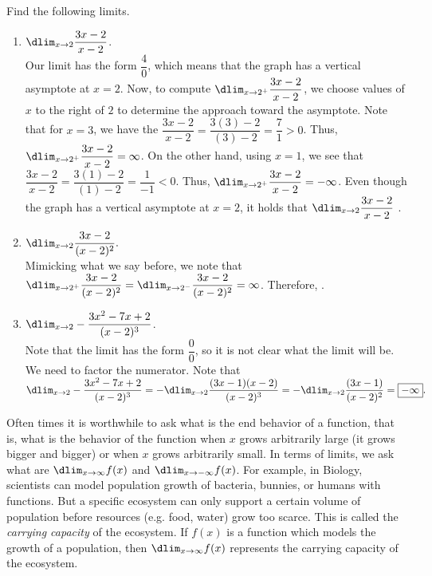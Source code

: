 \documentclass{book}
\begin{document}
\begin{Exam} Find the following limits.
\begin{enumerate}
\item $\dlim_{x\to 2} \dfrac{3x-2}{x-2}$.\\

Our limit has the form $\dfrac{4}{0}$, which means that the graph has a vertical asymptote at $x=2$. Now, to compute $\dlim_{x\to 2^+} \dfrac{3x-2}{x-2}$, we choose values of $x$ to the right of $2$ to determine the approach toward the asymptote. Note that for $x=3$, we have the $\dfrac{3x-2}{x-2}= \dfrac{3(3)-2}{(3)-2} = \dfrac{7}{1}>0$. Thus, $\dlim_{x\to 2^+} \dfrac{3x-2}{x-2} = \infty$. On the other hand, using $x=1$, we see that $\dfrac{3x-2}{x-2}= \dfrac{3(1)-2}{(1)-2} = \dfrac{1}{-1}<0$. Thus, $\dlim_{x\to 2^+} \dfrac{3x-2}{x-2} = -\infty$. Even though the graph has a vertical asymptote at $x=2$, it holds that $\dlim_{x\to 2} \dfrac{3x-2}{x-2}$ . \\

\item $\dlim_{x\to 2} \dfrac{3x-2}{(x-2)^2}.$\\

Mimicking what we say before, we note that $\dlim_{x\to 2^+} \dfrac{3x-2}{(x-2)^2} = \dlim_{x\to 2^-} \dfrac{3x-2}{(x-2)^2}=\infty$. Therefore, .\\

\item $\dlim_{x\to 2} -\dfrac{3x^2-7x+2}{(x-2)^3}$.\\

Note that the limit has the form $\dfrac{0}{0}$, so it is not clear what the limit will be. We need to factor the numerator. Note that $\dlim_{x\to 2}-\dfrac{3x^2-7x+2}{(x-2)^3} = - \dlim_{x\to 2}\dfrac{(3x-1)(x-2)}{(x-2)^3} = -\dlim_{x\to 2} \dfrac{(3x-1)}{(x-2)^2} = \fbox{$-\infty$}. $
\end{enumerate}
\end{Exam}\vs


Often times it is worthwhile to ask what is the end behavior of a function, that is, what is the behavior of the function when $x$ grows arbitrarily large (it grows bigger and bigger) or when $x$ grows arbitrarily small. In terms of limits, we ask what are $\dlim_{x\to \infty}f(x)$ and $\dlim_{x\to -\infty}f(x)$. For example, in Biology, scientists can model population growth of bacteria, bunnies, or humans with functions. But a specific ecosystem can only support a certain volume of population before resources (e.g. food, water) grow too scarce. This is called the \emph{carrying capacity} of the ecosystem. If $f(x)$ is a function which models the growth of a population, then $\dlim_{x\to \infty} f(x)$ represents the carrying capacity of the ecosystem.\\ 
\end{document}
